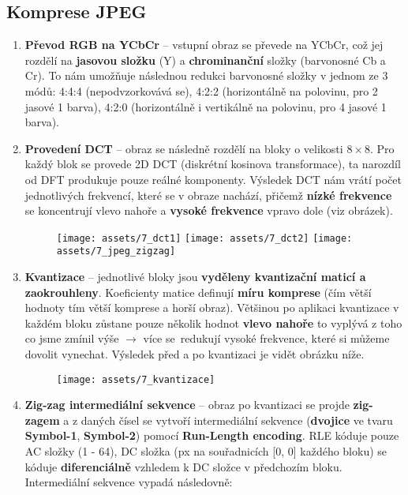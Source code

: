 \subsection{Komprese JPEG}
\begin{enumerate}
    \item \textbf{Převod RGB na YCbCr} -- vstupní obraz se převede na YCbCr, což jej rozdělí na \textbf{jasovou složku} (Y) a \textbf{chrominanční} složky (barvonosné Cb a Cr). To nám umožňuje následnou redukci barvonosné složky v jednom ze 3 módů: 4:4:4 (nepodvzorkovává se), 4:2:2 (horizontálně na polovinu, pro 2 jasové 1 barva), 4:2:0 (horizontálně i vertikálně na polovinu, pro 4 jasové 1 barva).
    \item \textbf{Provedení DCT} -- obraz se následně rozdělí na bloky o velikosti $8 \times 8$. Pro každý blok se provede 2D DCT (diskrétní kosinova transformace), ta narozdíl od DFT produkuje pouze reálné komponenty. Výsledek DCT nám vrátí počet jednotlivých frekvencí, které se v obraze nachází, přičemž \textbf{nízké frekvence} se koncentrují vlevo nahoře a \textbf{vysoké frekvence} vpravo dole (viz obrázek).
          \begin{figure}[H]
              \centering
              \texttt{[image: assets/7\_dct1]}
              \texttt{[image: assets/7\_dct2]}
              \texttt{[image: assets/7\_jpeg\_zigzag]}
          \end{figure}
    \item \textbf{Kvantizace} -- jednotlivé bloky jsou \textbf{vyděleny kvantizační maticí a zaokrouhleny}. Koeficienty matice definují \textbf{míru komprese} (čím větší hodnoty tím větší komprese a horší obraz). Většinou po aplikaci kvantizace v každém bloku zůstane pouze několik hodnot \textbf{vlevo nahoře} to vyplývá z toho co jsme zmínil výše $\rightarrow$ více se redukují vysoké frekvence, které si můžeme dovolit vynechat. Výsledek před a po kvantizaci je vidět obrázku níže.
          \begin{figure}[H]
              \centering
              \texttt{[image: assets/7\_kvantizace]}
          \end{figure}
    \item \textbf{Zig-zag intermediální sekvence} -- obraz po kvantizaci se projde \textbf{zig-zagem} a z daných čísel se vytvoří intermediální sekvence (\textbf{dvojice} ve tvaru \textbf{Symbol-1}, \textbf{Symbol-2}) pomocí \textbf{Run-Length encoding}. RLE kóduje pouze AC složky (1 - 64), DC složka (px na souřadnicích [0, 0] každého bloku) se kóduje \textbf{diferenciálně} vzhledem k DC složce v předchozím bloku. Intermediální sekvence vypadá následovně:

\end{enumerate}
